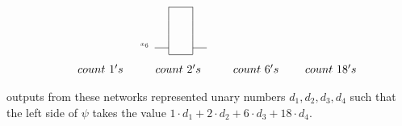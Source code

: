 \documentclass[envcountsame]{llncs}
\begin{document}
\begin{wrapfigure}{r}{80mm}
\[\begin{array}{cccc}
\begin{array}{ll|l|l}
    \end{array}
~~& \tiny    \begin{array}{ll|l|l}
      \cline{3-3}
          & ~ &\hspace{4mm} & ~\\
& ~ &\hspace{4mm} & ~\\
& ~ &\hspace{4mm} & ~\\
& ~ & & \\
& ~ & & \\
x_6 & ~ & & \\
        \cline{2-2} \cline{4-4}
          & & &\\
      \cline{3-3}
    \end{array}
\\[8mm]
~~~~count~1's & ~~~~count~2's & ~~~~count~6's& ~~~~count~18's 
\end{array}
\]\vspace{-12mm}
\end{wrapfigure}
outputs from these
networks represented unary numbers $d_1,d_2,d_3,d_4$ such that the left
side of $\psi$ takes the value $ 1\cdot d_1 + 2\cdot d_2 + 6\cdot d_3
+ 18\cdot d_4$.
\end{document}
